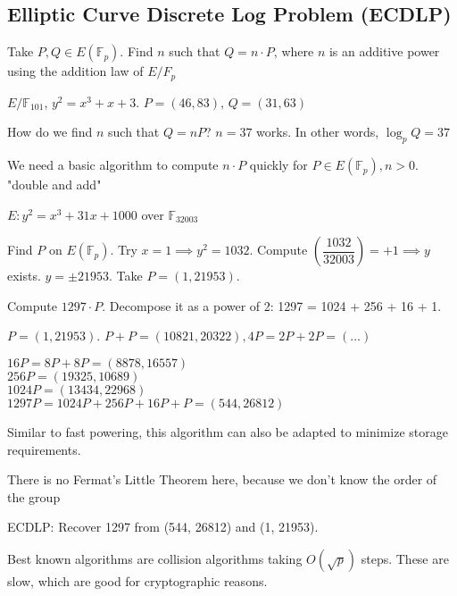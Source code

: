 \documentclass[twoside, 10pt]{article}
\newcommand{\F}{\mathbb{F}}
\begin{document}
\subsection{Elliptic Curve Discrete Log Problem (ECDLP)}
\begin{defn}
    Take $P, Q \in E(\F_p)$. Find $n$ such that $Q = n\cdot P$, where $n$ is an additive power using the addition law of $E/F_p$
\end{defn}

\begin{exm*}
    $E/\F_{101}$, $y^2 = x^3 + x + 3$. $P = (46, 83)$, $Q = (31, 63)$
\end{exm*}
How do we find $n$ such that $Q = nP$? $n = 37$ works. In other words, $\log_p Q = 37$

We need a basic algorithm to compute $n \cdot P$ quickly for $P \in E(\F_p), n > 0$. "double and add"

\begin{exm*}
    $E: y^2 = x^3 + 31x + 1000$ over $\F_{32003}$ %
\end{exm*}

Find $P$ on $E(\F_p)$. Try $x = 1 \implies y^2 = 1032$. Compute $\left(\dfrac{1032}{32003}\right) = +1 \implies y$ exists. $y = \pm 21953$. Take $P = (1, 21953)$.

Compute $1297 \cdot P$. Decompose it as a power of 2: 1297 = 1024 + 256 + 16 + 1.

$P = (1, 21953)$. $P + P = (10821, 20322), 4P = 2P + 2P = (\ldots)$

$16P = 8P + 8P = (8878, 16557)$\\
$256P = (19325, 10689)$\\
$1024P = (13434, 22968)$\\
$1297P = 1024P + 256P + 16P + P = (544, 26812)$

\begin{rmk}
    Similar to fast powering, this algorithm can also be adapted to minimize storage requirements.
\end{rmk}

\begin{rmk}
    There is no Fermat's Little Theorem here, because we don't know the order of the group
\end{rmk}

ECDLP: Recover 1297 from (544, 26812) and (1, 21953).

Best known algorithms are collision algorithms taking $O(\sqrt{p})$ steps. These are slow, which are good for cryptographic reasons.
\end{document}
